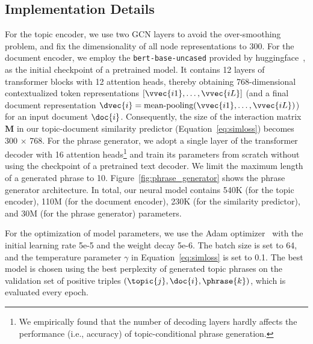 \subsection{Implementation Details}
\label{subsec:implementation}
For the topic encoder, we use two GCN layers to avoid the over-smoothing problem, and fix the dimensionality of all node representations to 300.
For the document encoder, we employ the \texttt{bert-base-uncased} provided by huggingface~\cite{devlin2019bert}, as the initial checkpoint of a pretrained model.
It contains 12 layers of transformer blocks with 12 attention heads, thereby obtaining 768-dimensional contextualized token representations $[\vvec{i1}, \ldots, \vvec{iL}]$ (and a final document representation $\dvec{i}=\text{mean-pooling}(\vvec{i1}, \ldots, \vvec{iL})$) for an input document $\doc{i}$.
Consequently, the size of the interaction matrix $\bm{M}$ in our topic-document similarity predictor (Equation~\eqref{eq:simloss}) becomes 300 $\times$ 768.
For the phrase generator, we adopt a single layer of the transformer decoder with 16 attention heads\footnote{We empirically found that the number of decoding layers hardly affects the performance (i.e., accuracy) of topic-conditional phrase generation.} and train its parameters from scratch without using the checkpoint of a pretrained text decoder.
We limit the maximum length of a generated phrase to 10.
Figure~\ref{fig:phrase_generator} shows the phrase generator architecture.
In total, our neural model contains 540K (for the topic encoder), 110M (for the document encoder), 230K (for the similarity predictor), and  30M (for the phrase generator) parameters.


For the optimization of model parameters, we use the Adam optimizer~\cite{kingma2014adam} with the initial learning rate 5e-5 and the weight decay 5e-6.
The batch size is set to 64, and the temperature parameter $\gamma$ in Equation~\eqref{eq:simloss} is set to 0.1.
The best model is chosen using the best perplexity of generated topic phrases on the validation set of positive triples $(\topic{j}, \doc{i}, \phrase{k})$, which is evaluated every epoch.

